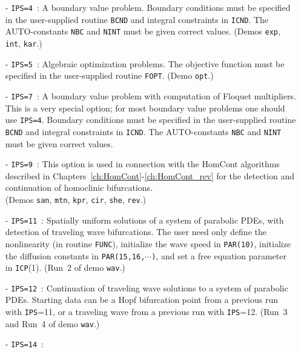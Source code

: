 \documentclass[12pt]{report}
\begin{document}
\begin{itemize}
\item[-] {\tt IPS=4}~: 
  A boundary value problem. Boundary conditions must be
  specified in the user-supplied routine {\tt BCND}
  and integral constraints in {\tt ICND}. The {\cal AUTO}-constants
  {\tt NBC} and {\tt NINT} must be given correct values.
 (Demos {\tt exp}, {\tt int}, {\tt kar}.)
\item[-] {\tt IPS=5}~:
  Algebraic optimization problems. The objective function
  must be specified in the user-supplied routine {\tt FOPT}. 
 (Demo {\tt opt}.)
\item[-] {\tt IPS=7}~:
  A boundary value problem with computation of Floquet multipliers. 
  This is a very special option; for most boundary value problems 
  one should use {\tt IPS=4}.
  Boundary conditions must be
  specified in the user-supplied routine {\tt BCND}
  and integral constraints in {\tt ICND}. The {\cal AUTO}-constants
  {\tt NBC} and {\tt NINT} must be given correct values.
\item[-] {\tt IPS=9}~:
  This option is used in connection with the {\cal HomCont} algorithms
  described in 
  Chapters~\ref{ch:HomCont}-\ref{ch:HomCont_rev}
  for the  detection and continuation of homoclinic bifurcations.\\  
 (Demos {\tt san}, {\tt mtn}, {\tt kpr}, {\tt cir}, {\tt she},
  {\tt rev}.)
\item[-] {\tt IPS=11}~: 
  Spatially uniform solutions of a system of parabolic PDEs,
  with detection of traveling wave bifurcations.
  The user need only define the nonlinearity (in routine {\tt FUNC}),
  initialize the wave speed in {\tt PAR(10)}, initialize the diffusion 
  constants in {\tt PAR(15,16,$\cdots$)}, and set a free equation parameter 
  in {\tt ICP}(1).
  (Run~2 of demo {\tt wav}.)
\item[-] {\tt IPS=12}~: 
  Continuation of traveling wave solutions to a system of parabolic PDEs.
  Starting data can be a Hopf bifurcation point from a previous run 
  with {\tt IPS}=11, or a traveling wave from a previous run with {\tt IPS}=12.
  (Run~3  and Run~4 of demo {\tt wav}.)
\item[-] {\tt IPS=14}~:  

\end{itemize}
\end{document}
